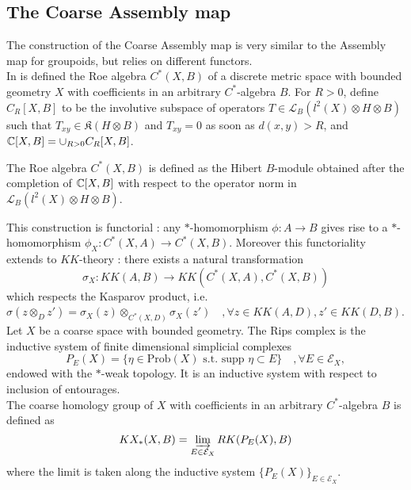 \subsection{The Coarse Assembly map}

The construction of the Coarse Assembly map is very similar to the Assembly map for groupoids, but relies on different functors.\\

In \cite{SkTuYu} is defined the Roe algebra $C^*(X,B)$ of a discrete metric space with bounded geometry $X$ with coefficients in an arbitrary $C^*$-algebra $B$. For $R>0$, define $C_R[X,B]$ to be the involutive subspace of operators $T\in \mathcal L_B(l^2(X)\otimes H\otimes B)$ such that $T_{xy}\in \mathfrak K(H\otimes B)$ and $T_{xy}=0$ as soon as $d(x,y)>R$, and $\mathbb C[X,B]= \cup_{R>0} C_R[X,B]$. 

\begin{definition}
The Roe algebra $C^*(X,B)$ is defined as the Hibert $B$-module obtained after the completion of $\mathbb C[X,B]$ with respect to the operator norm in $\mathcal L_B(l^2(X)\otimes H\otimes B)$.
\end{definition} 

This construction is functorial : any $*$-homomorphism $\phi: A\rightarrow B$ gives rise to a $*$-homomorphism $\phi_X : C^*(X,A)\rightarrow C^*(X,B)$. Moreover this functoriality extends to $KK$-theory : there exists a natural transformation 
\[\sigma_X : KK(A,B)\rightarrow KK(C^*(X,A),C^*(X,B))\]
which respects the Kasparov product, i.e. $\sigma(z\otimes_D z')=\sigma_X(z)\otimes_{C^*(X,D)} \sigma_X(z')\quad,\forall z\in KK(A,D),z'\in KK(D,B)$.\\

Let $X$ be a coarse space with bounded geometry. The Rips complex is the inductive system of finite dimensional simplicial complexes
\[P_E(X)=\{\eta\in \text{Prob}(X)\text{ s.t. supp }\eta\subset E\}\quad,\forall E\in \mathcal E_X,\]
endowed with the $*$-weak topology. It is an inductive system with respect to inclusion of entourages.\\
 
The coarse homology group of $X$ with coefficients in an arbitrary $C^*$-algebra $B$ is defined as 
\[KX_*(X,B)=\varinjlim_{E\in \mathcal E_X} RK(P_E(X),B)\]
where the limit is taken along the inductive system $\{P_E(X)\}_{E\in\mathcal E_X}$. \\

